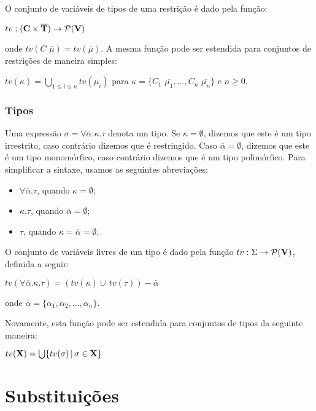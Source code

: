 O conjunto de vari\'aveis de tipos de uma restri\c{c}\~ao \'e dado pela fun\c{c}\~ao:
\begin{center}
	$tv:(\text{\textbf{C}}\times\overline{\text{\textbf{T}}})\rightarrow\mathcal{P}(\text{\textbf{V}})$
\end{center} 
onde $tv(C\,\,\overline{\mu})=tv(\overline{\mu})$.
A mesma fun\c{c}\~ao pode ser estendida para conjuntos de restri\c{c}\~oes de maneira simples:
\begin{center}
	$tv(\kappa) = \bigcup_{1 \leq i\leq n} tv(\mu_{i})$ para $\kappa=\{C_{1}\,\,\overline{\mu_{1}},...,C_{n}\,\,
	\overline{\mu_{n}}\}$ e $n\geq 0$.
\end{center} 


\subsubsection{Tipos}

Uma express\~ao $\sigma=\forall\overline{\alpha}.\kappa.\tau$ denota um tipo. Se $\kappa=\emptyset$, dizemos que 
este \'e um tipo irrestrito, caso contr\'ario dizemos que \'e restringido. Caso $\overline{\alpha}=\emptyset$, 
dizemos que este \'e um tipo monom\'orfico, caso contr\'ario dizemos que \'e um tipo polim\'orfico. 
Para simplificar a sintaxe, usamos as seguintes abrevia\c{c}\~oes:
\begin{itemize}
	\item $\forall\overline{\alpha}.\tau$, quando $\kappa = \emptyset$;
	\item $\kappa.\tau$, quando $\overline{\alpha}=\emptyset$;
	\item $\tau$, quando $\kappa = \overline{\alpha}=\emptyset$.
\end{itemize} 
O conjunto de vari\'aveis livres de um tipo \'e dado pela fun\c{c}\~ao 
$tv : \Sigma\rightarrow\mathcal{P}(\text{\textbf{V}})$, definida a seguir:
\begin{center}
	$tv(\forall\overline{\alpha}.\kappa.\tau)=(tv(\kappa)\cup\,tv(\tau)) - \overline{\alpha}$
\end{center}
onde $\overline{\alpha}=\{\alpha_{1},\alpha_{2},...,\alpha_{n}\}$.

Novamente, esta fun\c{c}\~ao pode ser estendida para conjuntos de tipos da seguinte maneira:
\begin{center}
   $tv(\text{\textbf{X}})=\bigcup\{tv(\sigma)\,|\,\sigma\in\text{\textbf{X}}\}$
\end{center}

\section{Substitui\c{c}\~oes}\label{substituicao}

